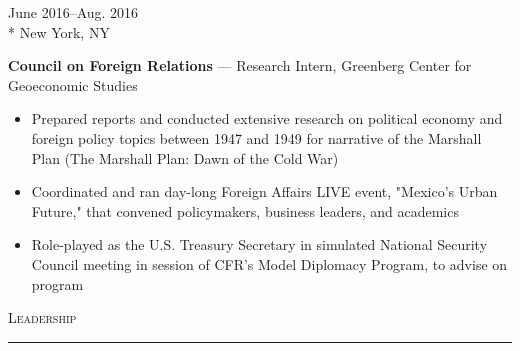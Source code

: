 \documentclass[a4paper,9pt]{article}
\begin{document}
\vspace{-3ex}
\begin{minipage}[t]{0.20\linewidth}
	\begin{small}
		\begin{spacing}{1.10}
			\begin{flushright}
				June 2016--Aug. 2016
				\\*
				\vspace*{2.5pt}
				New York, NY
			\end{flushright}
		\end{spacing}
	\end{small}
\end{minipage}
\hspace{4mm}
\begin{minipage}[t]{0.75\linewidth}
	\begin{small}
		\begin{spacing}{1.10}
			\begin{flushleft}
				\textbf{Council on Foreign Relations} --- Research Intern, Greenberg Center for Geoeconomic Studies
				\begin{itemize}[itemsep=0pt,topsep=2.5pt,leftmargin=*]
					\item Prepared reports and conducted extensive research on political economy and foreign policy topics between 1947 and 1949 for narrative of the Marshall Plan (The Marshall Plan: Dawn of the Cold War)
					\item Coordinated and ran day-long Foreign Affairs LIVE event, "Mexico's Urban Future," that convened policymakers, business leaders, and academics
					\item Role-played as the U.S. Treasury Secretary in simulated National Security Council meeting in session of CFR's Model Diplomacy Program, to advise on program
				\end{itemize}
			\end{flushleft}
		\end{spacing}
	\end{small}
\end{minipage}

\vspace{-5ex}
\vspace*{25pt}

\begin{Large}
	\textsc{Leadership}
\end{Large}
\vspace*{5pt}
\hrule
\vspace*{5pt}
\end{document}
